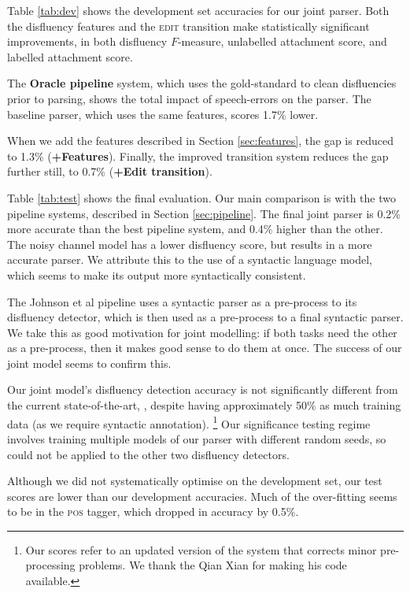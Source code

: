 \documentclass[11pt,letterpaper]{article}
\begin{document}
Table \ref{tab:dev} shows the development set accuracies for our joint parser.
Both the disfluency features and the 
\textsc{edit} transition make statistically significant improvements, in both
disfluency $F$-measure, unlabelled attachment score, and labelled attachment score.

The \textbf{Oracle pipeline} system, which uses the gold-standard to clean disfluencies
prior to parsing, shows the total impact of speech-errors on the parser.  The
baseline parser, which uses the same features, scores 1.7\% lower.

When we add the features described in Section \ref{sec:features}, the gap is reduced
to 1.3\% (\textbf{+Features}).  Finally, the improved transition system reduces
the gap further still, to 0.7\% (\textbf{+Edit transition}).

Table \ref{tab:test} shows the final evaluation.  
Our main comparison is with the two pipeline systems, described in Section
\ref{sec:pipeline}. 
The final joint parser is 0.2\% more accurate than the best pipeline system, and
0.4\% higher than the other.
The \citet{Johnson04a} noisy channel model has a lower
disfluency score, but results in a more accurate parser. We attribute this to
the use of a syntactic language model, which seems to make its output more syntactically
consistent.

The Johnson et al pipeline uses a syntactic parser as a pre-process to its
disfluency detector, which is then used as a pre-process to a final syntactic
parser.  We take this as good motivation for joint modelling: if both tasks need
the other as a pre-process, then it makes good sense to do them at once.  The
success of our joint model seems to confirm this.

Our joint model's disfluency detection accuracy is not significantly different from
the current state-of-the-art, \citet{qian:13}, despite having approximately 50\%
as much training data (as we require syntactic annotation).
\footnote{Our scores refer to an updated version of the system
that corrects minor pre-processing problems. We thank the Qian Xian for making
his code available.}
Our significance testing regime involves training multiple
models of our parser with different random seeds, so could not be applied to
the other two disfluency detectors.

Although we did not systematically
optimise on the development set, our test scores are lower than our development
accuracies. Much of the over-fitting seems to be in the \textsc{pos} tagger,
which dropped in accuracy by 0.5\%.
\end{document}
